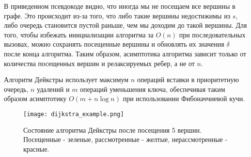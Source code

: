 В приведенном псевдокоде видно, что иногда мы не посещаем все вершины в графе. Это происходит из-за того, что либо такие вершины недостижимы из $s$, либо очередь становится пустой раньше, чем мы доходим до такой вершины. Для того, чтобы избежать инициализации алгоритма за $O(n)$ при последовательных вызовах, можно сохранять посещенные вершины и обновлять их значения $\delta$ после конца алгоритма. Таким образом, асимптотика алгоритма зависит только от количества посещенных вершин и релаксируемых ребер, а не от $n$. 

Алгоритм Дейкстры использует максимум $n$ операций вставки в приоритетную очередь, $n$ удалений и $m$ операций уменьшения ключа, обеспечивая таким образом асимптотику $O(m + n \log n)$ при использовании Фибоначчиевой кучи.

\begin{figure}[!h]
	\centering
	\texttt{[image: dijkstra\_example.png]}
	\caption{Состояние алгоритма Дейкстры после посещения 5 вершин. Посещенные - зеленые, рассмотренные - желтые, нерассмотренные - красные.}\label{fig1}
\end{figure}

\FloatBarrier
